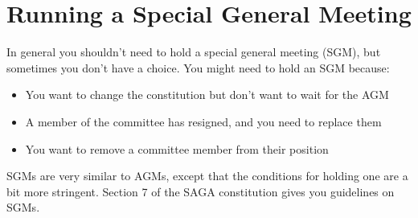 \section{Running a Special General Meeting}

In general you shouldn't need to hold a special general meeting (SGM), but sometimes you don't have a choice. You might need to hold an SGM because:

\begin{itemize}
  \item You want to change the constitution but don't want to wait for the AGM
  \item A member of the committee has resigned, and you need to replace them
  \item You want to remove a committee member from their position
\end{itemize}

SGMs are very similar to AGMs, except that the conditions for holding one are a bit more stringent.  Section 7 of the SAGA constitution gives you guidelines on SGMs.
